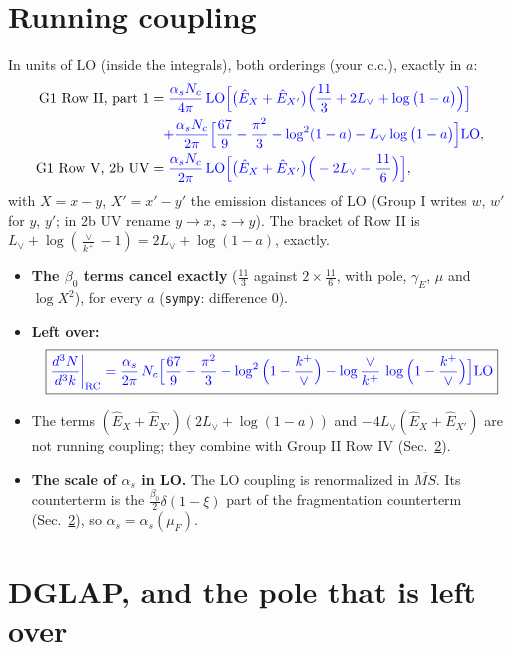 \documentclass[10pt]{article}
\numberwithin{equation}{section}
\newcommand{\new}[1]{{\color{blue}#1}}
\newcommand{\Lv}{L_{\vee}}
\newcommand{\Eh}{\hat E}
\newcommand{\la}{\log\big(1-a\big)}
\begin{document}
\section{Running coupling}\label{sec:rc}
In units of LO (inside the integrals), both orderings (your c.c.), exactly in $a$:
\begin{align}
\text{G1 Row II, part 1}&=\new{\frac{\alpha_sN_c}{4\pi}\,{\rm LO}\Big[\big(\Eh_X+\Eh_{X'}\big)\Big(\frac{11}{3}+2\Lv+\la\Big)\Big]}\notag\\
&\quad\new{+\frac{\alpha_sN_c}{2\pi}\Big[\frac{67}{9}-\frac{\pi^2}{3}-\log^2(1-a)-\Lv\la\Big]{\rm LO}},\label{eq:rcII}\\
\text{G1 Row V, 2b UV}&=\new{\frac{\alpha_sN_c}{2\pi}\,{\rm LO}\Big[\big(\Eh_X+\Eh_{X'}\big)\Big(-2\Lv-\frac{11}{6}\Big)\Big]},\label{eq:rcV}
\end{align}
with $X=x-y$, $X'=x'-y'$ the emission distances of LO (Group I writes $w$, $w'$ for $y$, $y'$; in 2b UV rename $y\to x$, $z\to y$). The bracket of Row II is $\Lv+\log(\frac{\vee}{k^+}-1)=2\Lv+\log(1-a)$, exactly.
\begin{itemize}
\item \textbf{The $\beta_0$ terms cancel exactly} ($\frac{11}{3}$ against $2\times\frac{11}{6}$, with pole, $\gamma_E$, $\mu$ and $\log X^2$), for every $a$ (\texttt{sympy}: difference $0$).
\item \textbf{Left over:}
\begin{equation}
\boxed{\new{\frac{d^3N}{d^3k}\bigg|_{\rm RC}=\frac{\alpha_s}{2\pi}\,N_c\Big[\frac{67}{9}-\frac{\pi^2}{3}-\log^2\Big(1-\frac{k^+}{\vee}\Big)-\log\frac{\vee}{k^+}\,\log\Big(1-\frac{k^+}{\vee}\Big)\Big]{\rm LO}}}
\label{eq:rc}
\end{equation}
\item The terms $(\Eh_X+\Eh_{X'})(2\Lv+\log(1-a))$ and $-4\Lv(\Eh_X+\Eh_{X'})$ are not running coupling; they combine with Group II Row IV (Sec.~\ref{sec:dglap}).
\item \textbf{The scale of $\alpha_s$ in LO.} The LO coupling is renormalized in $\overline{MS}$. Its counterterm is the $\frac{\beta_0}{2}\delta(1-\xi)$ part of the fragmentation counterterm (Sec.~\ref{sec:dglap}), so $\alpha_s=\alpha_s(\mu_F)$.
\end{itemize}

\section{DGLAP, and the pole that is left over}\label{sec:dglap}
\end{document}
